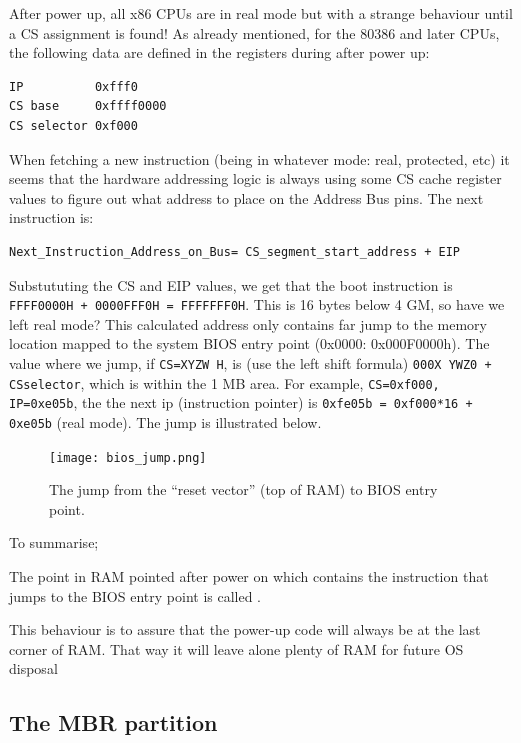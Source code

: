 \documentclass[a4paper]{article}
\begin{document}
After power up, all x86 CPUs are in real mode but with a strange behaviour until a CS assignment is found! As already mentioned, for the 80386 and later CPUs, the following data are defined in the registers during after power up:
\begin{verbatim}
IP          0xfff0
CS base     0xffff0000
CS selector 0xf000
\end{verbatim}
When fetching a new instruction (being in whatever mode: real, protected, etc) it seems that the hardware addressing logic is always using some CS cache register values to figure out what address to place on the Address Bus pins. The next instruction is:
\begin{verbatim}
Next_Instruction_Address_on_Bus= CS_segment_start_address + EIP
\end{verbatim}
Substututing the CS and EIP values, we get that the boot instruction is \texttt{FFFF0000H + 0000FFF0H = FFFFFFF0H}. This is 16 bytes below 4 GM, so have we left real mode? This calculated address only contains  far jump to the memory location mapped to the system BIOS entry point (0x0000: 0x000F0000h).
The value where we jump, if \texttt{CS=XYZW H}, is (use the left shift formula) \texttt{000X YWZ0 + CSselector}, which is within the 1 MB area. For example, \texttt{CS=0xf000, IP=0xe05b}, the the next ip (instruction pointer) is   \texttt{0xfe05b = 0xf000*16 + 0xe05b} (real mode). The jump is illustrated below.

\begin{figure}[H]
	\centering
	\texttt{[image: bios\_jump.png]}
	\caption{The jump from the ``reset vector'' (top of RAM) to BIOS entry point.}
\end{figure}
To summarise;
\begin{definition}
	The point in RAM pointed after power on which contains the instruction that jumps to the BIOS entry point is called . 
\end{definition}

This behaviour is to assure that the power-up code will always be at the last corner of RAM. That way it will leave alone plenty of RAM for future OS disposal


\newpage
\subsection{The MBR partition}
\label{app:mbr}
\end{document}
